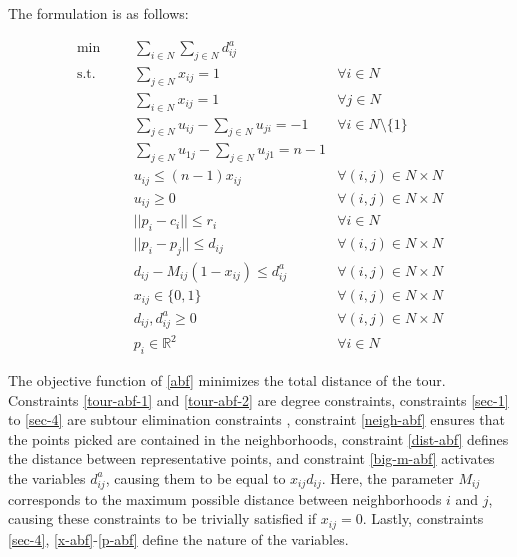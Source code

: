 \documentclass[pdflatex,sn-mathphys-num]{sn-jnl}%
\begin{document}
The formulation is as follows:

\begin{subequations}
\begin{align}
\min &&& \sum_{i \in N}\sum_{j\in N} d_{ij}^a &  \tag{ABF} \label{abf}\\
\text{s.t.} &&& \sum_{j \in N} x_{ij} = 1 & \forall i \in N \label{tour-abf-1}\\
&&& \sum_{i \in N} x_{ij} = 1 & \forall j \in N \label{tour-abf-2}\\
&&& \sum_{j\in N} u_{ij} - \sum_{j \in N} u_{ji} = -1 & \forall i \in N\setminus \{1\} \label{sec-1}\\
&&& \sum_{j\in N}u_{1j} - \sum_{j\in N}u_{j1} = n - 1 & \label{sec-2}\\	
&&& u_{ij} \leq (n-1)x_{ij} &\forall (i,j) \in N\times N \label{sec-3}\\
&&& u_{ij} \geq 0 & \forall (i,j) \in N \times N \label{sec-4}\\
&&& ||p_i - c_i|| \leq r_i &\forall i \in N \label{neigh-abf}\\
&&& ||p_i - p_j|| \leq d_{ij} &\forall (i,j) \in N\times N \label{dist-abf}\\
&&& d_{ij} - M_{ij}(1 - x_{ij}) \leq d_{ij}^a &\forall (i,j) \in N\times N \label{big-m-abf}\\
&&& x_{ij} \in \{0,1\} &\forall (i,j) \in N\times N \label{x-abf}\\
&&& d_{ij}, d_{ij}^a \geq 0 &\forall (i,j) \in N\times N \label{d-abf}\\
&&& p_i \in \mathbb{R}^2 &\forall i \in N \label{p-abf}
\end{align}
\end{subequations}

The objective function of \ref{abf} minimizes the total distance of the tour. Constraints \eqref{tour-abf-1} and \eqref{tour-abf-2} are degree constraints, constraints \eqref{sec-1} to \eqref{sec-4} are subtour elimination constraints \cite{SEC}, constraint \eqref{neigh-abf} ensures that the points picked are contained in the neighborhoods, constraint \eqref{dist-abf} defines the distance between representative points, and constraint \eqref{big-m-abf} activates the variables $d_{ij}^a$, causing them to be equal to $x_{ij}d_{ij}$. Here, the parameter $M_{ij}$ corresponds to the maximum possible distance between neighborhoods $i$ and $j$, causing these constraints to be trivially satisfied if $x_{ij} = 0$. Lastly, constraints \eqref{sec-4}, \eqref{x-abf}-\eqref{p-abf} define the nature of the variables.
\end{document}
